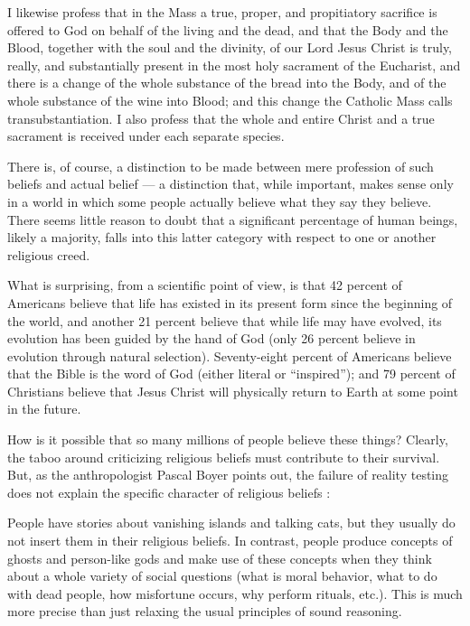 \documentclass[a4paper,14pt]{extarticle}
\begin{document}
I likewise profess that in the Mass a true, proper, and propitiatory sacrifice is offered to God on behalf of the living and the dead, and that the Body and the Blood, together with the soul and the divinity, of our Lord Jesus Christ is truly, really, and substantially present in the most holy sacrament of the Eucharist, and there is a change of the whole substance of the bread into the Body, and of the whole substance of the wine into Blood;
and this change the Catholic Mass calls transubstantiation.
I also profess that the whole and entire Christ and a true sacrament is received under each separate species.

There is, of course, a distinction to be made between mere profession of such beliefs and actual belief --- a distinction that, while important, makes sense only in a world in which some people actually believe what they say they believe.
There seems little reason to doubt that a significant percentage of human beings, likely a majority, falls into this latter category with respect to one or another religious creed.

What is surprising, from a scientific point of view, is that 42 percent of Americans believe that life has existed in its present form since the beginning of the world, and another 21 percent believe that while life may have evolved, its evolution has been guided by the hand of God (only 26 percent believe in evolution through natural selection).
Seventy-eight percent of Americans believe that the Bible is the word of God (either literal or ``inspired'');
and 79 percent of Christians believe that Jesus Christ will physically return to Earth at some point in the future.

How is it possible that so many millions of people believe these things?
Clearly, the taboo around criticizing religious beliefs must contribute to their survival.
But, as the anthropologist Pascal Boyer points out, the failure of reality testing does not explain the specific character of religious beliefs :

People have stories about vanishing islands and talking cats, but they usually do not insert them in their religious beliefs.
In contrast, people produce concepts of ghosts and person-like gods and make use of these concepts when they think about a whole variety of social questions (what is moral behavior, what to do with dead people, how misfortune occurs, why perform rituals, etc.).
This is much more precise than just relaxing the usual principles of sound reasoning.
\end{document}
